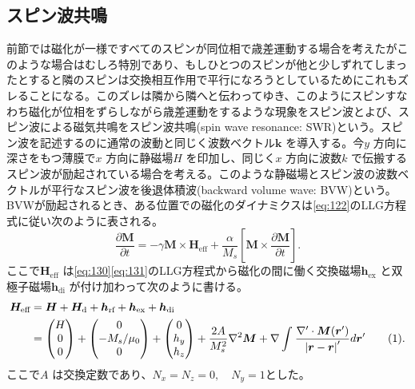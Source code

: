 \documentclass[dvipdfmx]{jsreport}
\numberwithin{equation}{chapter}
\numberwithin{table}{chapter}
\begin{document}
\subsection{スピン波共鳴}
前節では磁化が一様ですべてのスピンが同位相で歳差運動する場合を考えたがこのような場合はむしろ特別であり、もしひとつのスピンが他と少しずれてしまったとすると隣のスピンは交換相互作用で平行になろうとしているためにこれもズレることになる。このズレは隣から隣へと伝わってゆき、このようにスピンすなわち磁化が位相をずらしながら歳差運動をするような現象をスピン波とよび、スピン波による磁気共鳴をスピン波共鳴(spin wave resonance: SWR)という。スピン波を記述するのに通常の波動と同じく波数ベクトル$\bm{k}$ を導入する。今$y$ 方向に深さをもつ薄膜で$x$ 方向に静磁場$H$ を印加し、同じく$x$ 方向に波数$k$ で伝搬するスピン波が励起されている場合を考える。このような静磁場とスピン波の波数ベクトルが平行なスピン波を後退体積波(backward volume wave: BVW)という。
BVWが励起されるとき、ある位置での磁化のダイナミクスは\eqref{eq:122}のLLG方程式に従い次のように表される。
\begin{equation}
\label{eq:148}
	\frac{\partial \bm{M}}{\partial t} =-\gamma \bm{M}\times \bm{H}_\text{eff} +\frac{\alpha}{M_s}\left[ \bm{M}\times \frac{\partial \bm{M}}{\partial t}  \right] 
.\end{equation}
ここで$\bm{H}_\text{eff} $ は\eqref{eq:130}\eqref{eq:131}のLLG方程式から磁化の間に働く交換磁場$\bm{h}_\text{ex} $ と双極子磁場$\bm{h}_\text{di} $ が付け加わって次のように書ける\cite{ku}。
\begin{align*}
\label{eq:149}
	\bm{H}_\text{eff} &=\bm{H}+\bm{H}_\text{d} +\bm{h}_\text{rf} +\bm{h}_\text{ex} +\bm{h}_\text{di}\\
					  &=\begin{pmatrix} H\\0\\0 \end{pmatrix} +\begin{pmatrix} 0\\-M_s /\mu_0\\0 \end{pmatrix} +\begin{pmatrix} 0 \\ h_y \\h_z \end{pmatrix} +\frac{2A}{M_s^2}\nabla ^2\bm{M}+\nabla \int_{}^{} \frac{\nabla '\cdot \bm{M}(\bm{r}')}{\abs{\bm{r}-\bm{r}}'}d\bm{r}'
					  \stepcounter{equation}\tag{\theequation} 
.\end{align*}
ここで$A$ は交換定数であり、$N_x=N_z=0,\quad N_y=1$とした。
\end{document}
